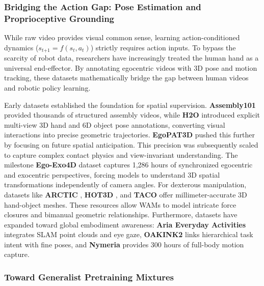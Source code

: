\subsubsection{Bridging the Action Gap: Pose Estimation and Proprioceptive Grounding} 
While raw video provides visual common sense, learning action-conditioned dynamics ($s_{t\text{+}1} = f\left(s_t, a_t\right)$) strictly requires action inputs. To bypass the scarcity of robot data, researchers have increasingly treated the human hand as a universal end-effector. By annotating egocentric videos with 3D pose and motion tracking, these datasets mathematically bridge the gap between human videos and robotic policy learning.

Early datasets established the foundation for spatial supervision. \textbf{Assembly101} \cite{Assembly101} provided thousands of structured assembly videos, while \textbf{H2O} \cite{H2O} introduced explicit multi-view 3D hand and 6D object pose annotations, converting visual interactions into precise geometric trajectories. \textbf{EgoPAT3D} \cite{EgoPAT3D} pushed this further by focusing on future spatial anticipation. This precision was subsequently scaled to capture complex contact physics and view-invariant understanding. The milestone \textbf{Ego-Exo4D} \cite{Ego-Exo4D} dataset captures 1,286 hours of synchronized egocentric and exocentric perspectives, forcing models to understand 3D spatial transformations independently of camera angles. For dexterous manipulation, datasets like \textbf{ARCTIC} \cite{ARCTIC}, \textbf{HOT3D} \cite{HOT3D}, and \textbf{TACO} \cite{TACO} offer millimeter-accurate 3D hand-object meshes. These resources allow WAMs to model intricate force closures and bimanual geometric relationships. Furthermore, datasets have expanded toward global embodiment awareness: \textbf{Aria Everyday Activities} \cite{Aria-Everyday-Activities} integrates SLAM point clouds and eye gaze, \textbf{OAKINK2} \cite{OAKINK2} links hierarchical task intent with fine poses, and \textbf{Nymeria} \cite{Nymeria} provides 300 hours of full-body motion capture.

\subsubsection{Toward Generalist Pretraining Mixtures} 

